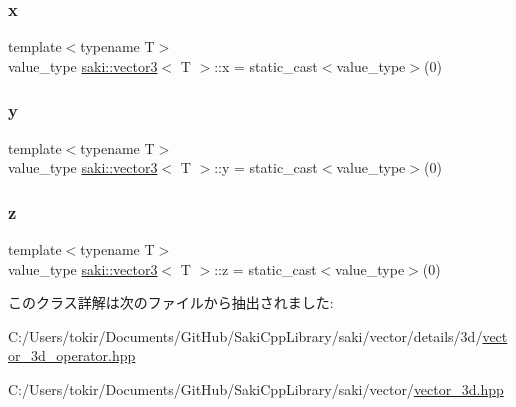 \subsubsection{\texorpdfstring{x}{x}}
{\footnotesize\ttfamily template$<$typename T$>$ \\
value\+\_\+type \mbox{\hyperlink{classsaki_1_1vector3}{saki\+::vector3}}$<$ T $>$\+::x = static\+\_\+cast$<$value\+\_\+type$>$(0)}

\mbox{\label{classsaki_1_1vector3_a5ecb4148ebb05a45be8371459a57b1b2}} 
\subsubsection{\texorpdfstring{y}{y}}
{\footnotesize\ttfamily template$<$typename T$>$ \\
value\+\_\+type \mbox{\hyperlink{classsaki_1_1vector3}{saki\+::vector3}}$<$ T $>$\+::y = static\+\_\+cast$<$value\+\_\+type$>$(0)}

\mbox{\label{classsaki_1_1vector3_a910df22d3a9c3a2da377756454f3b645}} 
\subsubsection{\texorpdfstring{z}{z}}
{\footnotesize\ttfamily template$<$typename T$>$ \\
value\+\_\+type \mbox{\hyperlink{classsaki_1_1vector3}{saki\+::vector3}}$<$ T $>$\+::z = static\+\_\+cast$<$value\+\_\+type$>$(0)}



このクラス詳解は次のファイルから抽出されました\+:\begin{DoxyCompactItemize}
\item 
C\+:/\+Users/tokir/\+Documents/\+Git\+Hub/\+Saki\+Cpp\+Library/saki/vector/details/3d/\mbox{\hyperlink{vector__3d__operator_8hpp}{vector\+\_\+3d\+\_\+operator.\+hpp}}\item 
C\+:/\+Users/tokir/\+Documents/\+Git\+Hub/\+Saki\+Cpp\+Library/saki/vector/\mbox{\hyperlink{vector__3d_8hpp}{vector\+\_\+3d.\+hpp}}\end{DoxyCompactItemize}
